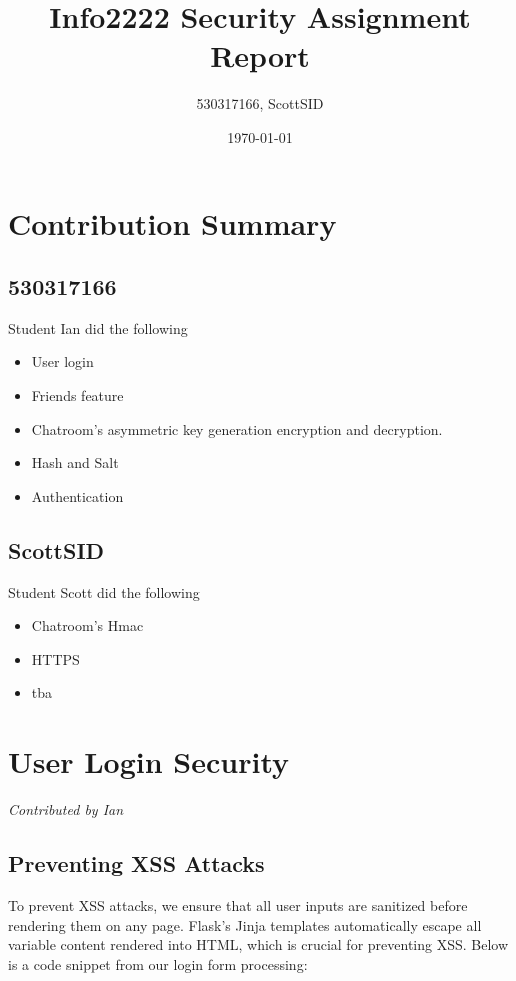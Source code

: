 \documentclass{article}
\title{Info2222 Security Assignment Report}
\author{530317166, ScottSID}
\date{\today}
\begin{document}
\maketitle

\section*{Contribution Summary}

\subsection{530317166}
Student Ian did the following
\begin{itemize}
    \item User login
    \item Friends feature
    \item Chatroom's asymmetric key generation encryption and decryption. 
    \item Hash and Salt
    \item Authentication
\end{itemize}

\subsection{ScottSID}
Student Scott did the following
\begin{itemize}
    \item Chatroom's Hmac 
    \item HTTPS
    \item tba
\end{itemize}

\section{User Login Security}
\textit{Contributed by Ian}

\subsection{Preventing XSS Attacks}
To prevent XSS attacks, we ensure that all user inputs are sanitized before rendering them on any page. Flask’s Jinja templates automatically escape all variable content rendered into HTML, which is crucial for preventing XSS. Below is a code snippet from our login form processing:
\end{document}
